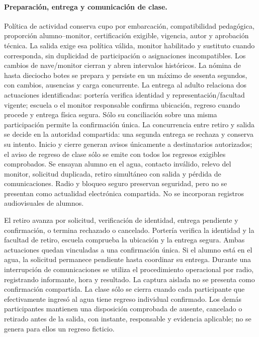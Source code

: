 \paragraph{Preparación, entrega y comunicación de clase.}
Política de actividad conserva cupo por embarcación, compatibilidad pedagógica, proporción alumno--monitor, certificación exigible, vigencia, autor y aprobación técnica. La salida exige esa política válida, monitor habilitado y sustituto cuando corresponda, sin duplicidad de participación o asignaciones incompatibles. Los cambios de nave/monitor cierran y abren intervalos históricos. La nómina de hasta dieciocho botes se prepara y persiste en un máximo de sesenta segundos, con cambios, ausencias y carga concurrente.
La entrega al adulto relaciona dos actuaciones identificadas: portería verifica identidad y representación/facultad vigente; escuela o el monitor responsable confirma ubicación, regreso cuando procede y entrega física segura. Sólo su conciliación sobre una misma participación permite la confirmación única. La concurrencia entre retiro y salida se decide en la autoridad compartida: una segunda entrega se rechaza y conserva su intento. Inicio y cierre generan avisos únicamente a destinatarios autorizados; el aviso de regreso de clase sólo se emite con todos los regresos exigibles comprobados.
Se ensayan alumno en el agua, contacto inválido, relevo del monitor, solicitud duplicada, retiro simultáneo con salida y pérdida de comunicaciones. Radio y bloqueo seguro preservan seguridad, pero no se presentan como actualidad electrónica compartida. No se incorporan registros audiovisuales de alumnos.

El retiro avanza por solicitud, verificación de identidad, entrega pendiente y confirmación, o termina rechazado o cancelado. Portería verifica la identidad y la facultad de retiro, escuela comprueba la ubicación y la entrega segura. Ambas actuaciones quedan vinculadas a una confirmación única. Si el alumno está en el agua, la solicitud permanece pendiente hasta coordinar su entrega. Durante una interrupción de comunicaciones se utiliza el procedimiento operacional por radio, registrando informante, hora y resultado. La captura aislada no se presenta como confirmación compartida. La clase sólo se cierra cuando cada participante que efectivamente ingresó al agua tiene regreso individual confirmado. Los demás participantes mantienen una disposición comprobada de ausente, cancelado o retirado antes de la salida, con instante, responsable y evidencia aplicable; no se genera para ellos un regreso ficticio.


